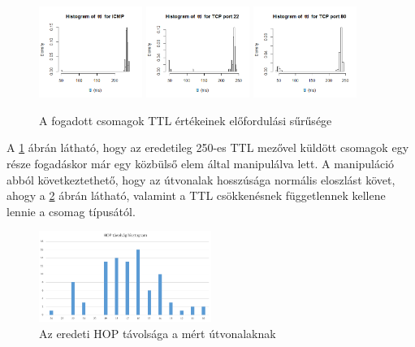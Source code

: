 \begin{figure}[!ht]
	\centering
	\includegraphics[width=0.3\textwidth, keepaspectratio]{figures/hist-ttl-icmp.png}
	\includegraphics[width=0.3\textwidth, keepaspectratio]{figures/ttl-hist-22.png}
	\includegraphics[width=0.3\textwidth, keepaspectratio]{figures/ttl-hist-port80.png}
	\caption{A fogadott csomagok TTL értékeinek előfordulási sűrűsége}
	\label{fig:ttl-hist}
\end{figure}

A \ref{fig:ttl-hist} ábrán látható, hogy az eredetileg 250-es TTL mezővel küldött csomagok egy része fogadáskor már egy közbülső elem által manipulálva lett. A manipuláció abból következtethető, hogy az útvonalak hosszúsága normális eloszlást követ, ahogy a \ref{fig:hop-hist} ábrán látható, valamint a TTL csökkenésnek függetlennek kellene lennie a csomag típusától.

\begin{figure}[!ht]
	\centering
	\includegraphics[width=0.5\textwidth, keepaspectratio]{figures/hop-hist.png}
	\caption{Az eredeti HOP távolsága a mért útvonalaknak}
	\label{fig:hop-hist}
\end{figure}

